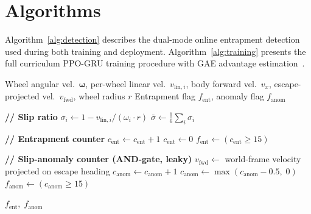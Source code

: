 \documentclass[conference]{IEEEtran}
\begin{document}
\section{Algorithms}
\label{sec:algorithms}

Algorithm~\ref{alg:detection} describes the dual-mode online entrapment detection
used during both training and deployment.
Algorithm~\ref{alg:training} presents the full curriculum PPO-GRU training
procedure with GAE advantage estimation~\cite{schulman2015gae}.

\begin{algorithm}[!htbp]
  \caption{Dual-Mode Entrapment Detection}
  \label{alg:detection}
  \begin{algorithmic}[1]
    \Require Wheel angular vel.\ $\boldsymbol{\omega}$, per-wheel linear vel.\
             $v_{\text{lin},i}$, body forward vel.\ $v_x$, escape-projected vel.\
             $v_\text{fwd}$, wheel radius $r$
    \Ensure  Entrapment flag $f_\text{ent}$, anomaly flag $f_\text{anom}$

    \State \textbf{// Slip ratio}
      \State $\sigma_i \gets 1 - v_{\text{lin},i} / (\omega_i \cdot r)$
    \EndFor
    \State $\bar{\sigma} \gets \tfrac{1}{6}\sum_i \sigma_i$

    \State \textbf{// Entrapment counter}
      \State $c_\text{ent} \gets c_\text{ent} + 1$
    \Else
      \State $c_\text{ent} \gets 0$
    \EndIf
    \State $f_\text{ent} \gets (c_\text{ent} \geq 15)$

    \State \textbf{// Slip-anomaly counter (AND-gate, leaky)}
    \State $v_\text{fwd} \gets$ world-frame velocity projected on escape heading
      \State $c_\text{anom} \gets c_\text{anom} + 1$
    \Else
      \State $c_\text{anom} \gets \max(c_\text{anom} - 0.5,\; 0)$
    \EndIf
    \State $f_\text{anom} \gets (c_\text{anom} \geq 15)$

    \State \Return $f_\text{ent},\; f_\text{anom}$
  \end{algorithmic}
\end{algorithm}
\end{document}
